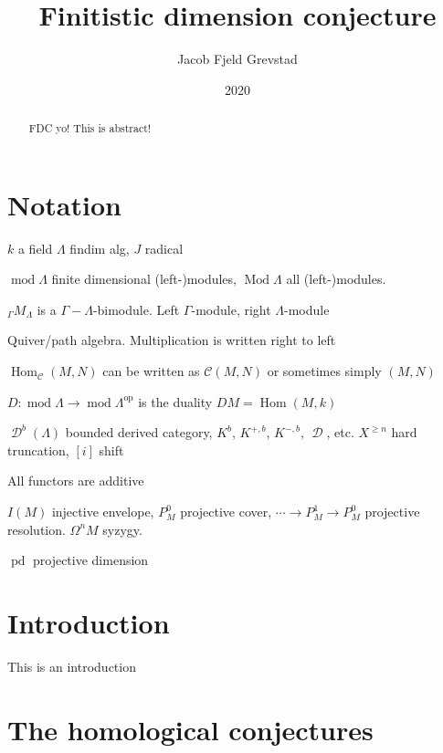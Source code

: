 \documentclass[11pt, a4paper, english]{article}
\theoremstyle{definition}
\DeclareMathOperator{\Hom}{Hom}
\DeclareMathOperator{\pd}{pd}
\DeclareMathOperator{\Mod}{Mod}
\def\mod{\operatorname{mod}}
\DeclareMathOperator{\D}{\mathcal{D}}
\begin{document}
\title{Finitistic dimension conjecture}
\author{Jacob Fjeld Grevstad}
\date{2020}
\maketitle
{}

\begin{abstract}
FDC yo! This is abstract!
\end{abstract}
\clearpage

\tableofcontents
\clearpage

\section*{Notation}
%
$k$ a field $\Lambda$ findim alg, $J$ radical

$\mod\Lambda$ finite dimensional (left-)modules, $\Mod\Lambda$ all (left-)modules.

$_\Gamma M_\Lambda$ is a $\Gamma-\Lambda$-bimodule. Left $\Gamma$-module, right $\Lambda$-module

Quiver/path algebra. Multiplication is written right to left

$\Hom_{\mathcal C}(M, N)$ can be written as $\mathcal C(M,N)$ or sometimes simply $(M,N)$

$D: \mod \Lambda \to \mod\Lambda^{\operatorname{op}}$ is the duality $DM = \Hom(M, k)$

$\D^b(\Lambda)$ bounded derived category, $K^b$, $K^{+,b}$, $K^{-, b}$, $\D$, etc. $X^{\geq n}$ hard truncation, $[i]$ shift

All functors are additive

$I(M)$ injective envelope, $P_M^0$ projective cover, $\cdots \to P_M^1 \to P_M^0$ projective resolution. $\Omega^n M$ syzygy.

$\pd$ projective dimension

\newpage

\section*{Introduction}
%

This is an introduction

\section{The homological conjectures}

\end{document}
